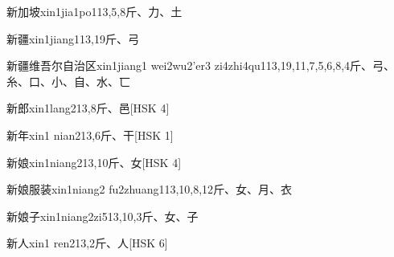 \begin{EntryWithPhonetic}{新加坡}{xin1jia1po1}{13,5,8}{⽄、⼒、⼟}
\end{EntryWithPhonetic}

\begin{EntryWithPhonetic}{新疆}{xin1jiang1}{13,19}{⽄、⼸}
\end{EntryWithPhonetic}

\begin{EntryWithPhonetic}{新疆维吾尔自治区}{xin1jiang1 wei2wu2'er3 zi4zhi4qu1}{13,19,11,7,5,6,8,4}{⽄、⼸、⽷、⼝、⼩、⾃、⽔、⼖}
\end{EntryWithPhonetic}

\begin{EntryWithPhonetic}{新郎}{xin1lang2}{13,8}{⽄、⾢}[HSK 4]
\end{EntryWithPhonetic}

\begin{EntryWithPhonetic}{新年}{xin1 nian2}{13,6}{⽄、⼲}[HSK 1]
\end{EntryWithPhonetic}

\begin{EntryWithPhonetic}{新娘}{xin1niang2}{13,10}{⽄、⼥}[HSK 4]
\end{EntryWithPhonetic}

\begin{EntryWithPhonetic}{新娘服装}{xin1niang2 fu2zhuang1}{13,10,8,12}{⽄、⼥、⽉、⾐}
\end{EntryWithPhonetic}

\begin{EntryWithPhonetic}{新娘子}{xin1niang2zi5}{13,10,3}{⽄、⼥、⼦}
\end{EntryWithPhonetic}

\begin{EntryWithPhonetic}{新人}{xin1 ren2}{13,2}{⽄、⼈}[HSK 6]
\end{EntryWithPhonetic}


